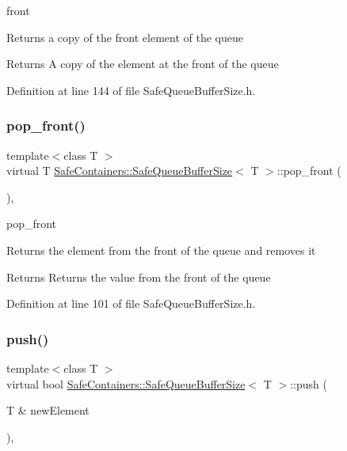 front 

Returns a copy of the front element of the queue

\begin{DoxyReturn}{Returns}
A copy of the element at the front of the queue 
\end{DoxyReturn}


Definition at line 144 of file Safe\+Queue\+Buffer\+Size.\+h.

\mbox{\label{classSafeContainers_1_1SafeQueueBufferSize_ad79da418fbe0e89212c3cecf69dbe43a}} 
\subsubsection{\texorpdfstring{pop\_front()}{pop\_front()}}
{\footnotesize\ttfamily template$<$class T $>$ \\
virtual T \mbox{\hyperlink{classSafeContainers_1_1SafeQueueBufferSize}{Safe\+Containers\+::\+Safe\+Queue\+Buffer\+Size}}$<$ T $>$\+::pop\+\_\+front (\begin{DoxyParamCaption}{ }\end{DoxyParamCaption})\hspace{0.3cm}{\ttfamily [inline]}, {\ttfamily [virtual]}}



pop\+\_\+front 

Returns the element from the front of the queue and removes it

\begin{DoxyReturn}{Returns}
Returns the value from the front of the queue 
\end{DoxyReturn}


Definition at line 101 of file Safe\+Queue\+Buffer\+Size.\+h.

\mbox{\label{classSafeContainers_1_1SafeQueueBufferSize_ae807868ecb6d9d052460d3e672465902}} 
\subsubsection{\texorpdfstring{push()}{push()}}
{\footnotesize\ttfamily template$<$class T $>$ \\
virtual bool \mbox{\hyperlink{classSafeContainers_1_1SafeQueueBufferSize}{Safe\+Containers\+::\+Safe\+Queue\+Buffer\+Size}}$<$ T $>$\+::push (\begin{DoxyParamCaption}\item[{T \&}]{new\+Element }\end{DoxyParamCaption})\hspace{0.3cm}{\ttfamily [inline]}, {\ttfamily [virtual]}}




